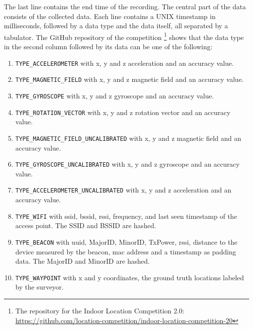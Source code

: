 The last line contains the end time of the recording.
The central part of the data consists of the collected data. 
Each line contains a UNIX timestamp in milliseconds, followed by a data type and the data itself, all separated by a tabulator.
The GitHub repository of the competition \footnote{The repository for the Indoor Location Competition 2.0: \url{https://github.com/location-competition/indoor-location-competition-20}} shows that the data type in the second column followed by its data can be one of the following:

\begin{enumerate}
    \item\label{type:acce} \texttt{TYPE\_ACCELEROMETER} with x, y and z acceleration and an accuracy value.
    \item\label{type:mag}  \texttt{TYPE\_MAGNETIC\_FIELD} with x, y and z magnetic field and an accuracy value.
    \item\label{type:gyro}  \texttt{TYPE\_GYROSCOPE} with x, y and z gyroscope and an accuracy value.
    \item\label{type:rot}  \texttt{TYPE\_ROTATION\_VECTOR} with x, y and z rotation vector and an accuracy value.
    \item\label{type:mag_u}  \texttt{TYPE\_MAGNETIC\_FIELD\_UNCALIBRATED} with x, y and z magnetic field and an accuracy value.
    \item\label{type:gyro_u}  \texttt{TYPE\_GYROSCOPE\_UNCALIBRATED} with x, y and z gyroscope and an accuracy value.
    \item\label{type:acce_u}  \texttt{TYPE\_ACCELEROMETER\_UNCALIBRATED} with x, y and z acceleration and an accuracy value.
    \item\label{type:wifi}  \texttt{TYPE\_WIFI} with \ac{ssid}, \ac{bssid}, \ac{rssi}, frequency, and last seen timestamp of the access point. The SSID and BSSID are hashed.
    \item\label{type:beacon}  \texttt{TYPE\_BEACON} with \ac{uuid}, \ac{MajorID}, \ac{MinorID}, \ac{TxPower}, \ac{rssi}, distance to the device measured by the beacon, \ac{mac} address and a timestamp as padding data. The MajorID and MinorID are hashed.
    \item\label{type:way}  \texttt{TYPE\_WAYPOINT} with x and y coordinates, the ground truth locations labeled by the surveyor.
\end{enumerate}

